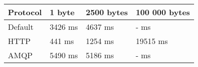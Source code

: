 \begin{tabularx}{\textwidth}{llll}
\hline
 Protocol   & 1 byte   & 2500 bytes   & 100 000 bytes   \\
\hline
 Default    & 3426 ms  & 4637 ms      & - ms            \\
 HTTP       & 441 ms   & 1254 ms      & 19515 ms        \\
 AMQP       & 5490 ms  & 5186 ms      & - ms            \\
\hline
\end{tabularx}